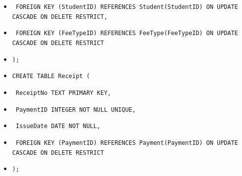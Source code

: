 \documentclass[11pt]{article}
\begin{document}
\begin{exoresolu}
\begin{methode}
\begin{itemize}
    \item \texttt{    FOREIGN KEY (StudentID) REFERENCES Student(StudentID) ON UPDATE CASCADE ON DELETE RESTRICT,}
    \item \texttt{    FOREIGN KEY (FeeTypeID) REFERENCES FeeType(FeeTypeID) ON UPDATE CASCADE ON DELETE RESTRICT}
    \item \texttt{);}
    \item \texttt{CREATE TABLE Receipt (}
    \item \texttt{    ReceiptNo TEXT PRIMARY KEY,}
    \item \texttt{    PaymentID INTEGER NOT NULL UNIQUE,}
    \item \texttt{    IssueDate DATE NOT NULL,}
    \item \texttt{    FOREIGN KEY (PaymentID) REFERENCES Payment(PaymentID) ON UPDATE CASCADE ON DELETE RESTRICT}
    \item \texttt{);}
\end{itemize}
\end{methode}


\end{exoresolu}
\end{document}
